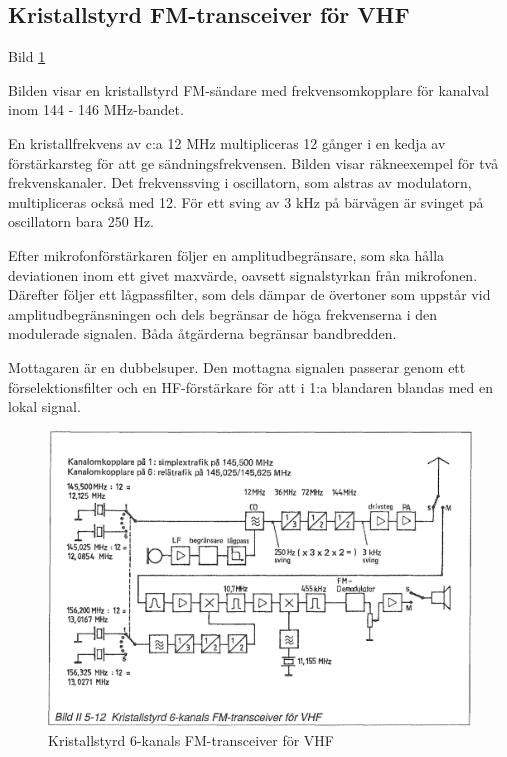 \subsection{Kristallstyrd FM-transceiver för VHF}

Bild \ref{fig:bildII5-12}

Bilden visar en kristallstyrd FM-sändare med frekvensomkopplare för
kanalval inom 144 - 146 MHz-bandet.

En kristallfrekvens av c:a 12 MHz multipliceras 12 gånger i en kedja
av förstärkarsteg för att ge sändningsfrekvensen. Bilden visar
räkneexempel för två frekvenskanaler. Det frekvenssving i oscillatorn,
som alstras av modulatorn, multipliceras också med 12.  För ett sving
av 3 kHz på bärvågen är svinget på oscillatorn bara 250 Hz.

Efter mikrofonförstärkaren följer en amplitudbegränsare, som ska
hålla deviationen inom ett givet maxvärde, oavsett signalstyrkan från
mikrofonen. Därefter följer ett lågpassfilter, som dels dämpar de
övertoner som uppstår vid amplitudbegränsningen och dels begränsar de
höga frekvenserna i den modulerade signalen. Båda åtgärderna begränsar
bandbredden.

Mottagaren är en dubbelsuper. Den mottagna signalen passerar genom ett
förselektionsfilter och en HF-förstärkare för att i 1:a blandaren
blandas med en lokal signal.

\begin{figure}
  \includegraphics[width=\textwidth]{images/bild_2_5-12}
  \caption{Kristallstyrd 6-kanals FM-transceiver för VHF}
  \label{fig:bildII5-12}
\end{figure}

